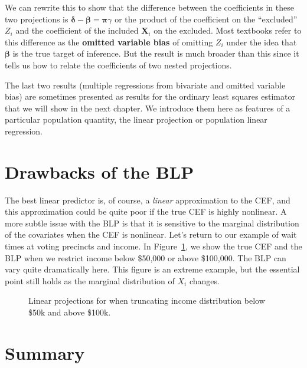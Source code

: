 \documentclass[
  13pt,
  letterpaper,
  DIV=11,
  numbers=noendperiod]{scrreprt}
\newcommand{\bs}{\symbf}
\newcommand{\mb}{\symbf}
\newcommand{\X}{\mb{X}}
\newcommand{\bfbeta}{\mb{\beta}}
\theoremstyle{plain}
\theoremstyle{definition}
\theoremstyle{definition}
\theoremstyle{remark}
\begin{document}
We can rewrite this to show that the difference between the coefficients
in these two projections is \(\bs{\delta} - \bfbeta= \bs{\pi}\gamma\) or
the product of the coefficient on the ``excluded'' \(Z_i\) and the
coefficient of the included \(\X_i\) on the excluded. Most textbooks
refer to this difference as the \textbf{omitted variable bias} of
omitting \(Z_i\) under the idea that \(\bfbeta\) is the true target of
inference. But the result is much broader than this since it tells us
how to relate the coefficients of two nested projections.

The last two results (multiple regressions from bivariate and omitted
variable bias) are sometimes presented as results for the ordinary least
squares estimator that we will show in the next chapter. We introduce
them here as features of a particular population quantity, the linear
projection or population linear regression.

\section{Drawbacks of the BLP}\label{drawbacks-of-the-blp}

The best linear predictor is, of course, a \emph{linear} approximation
to the CEF, and this approximation could be quite poor if the true CEF
is highly nonlinear. A more subtle issue with the BLP is that it is
sensitive to the marginal distribution of the covariates when the CEF is
nonlinear. Let's return to our example of wait times at voting precincts
and income. In Figure~\ref{fig-blp-limits}, we show the true CEF and the
BLP when we restrict income below \$50,000 or above \$100,000. The BLP
can vary quite dramatically here. This figure is an extreme example, but
the essential point still holds as the marginal distribution of \(X_i\)
changes.

\begin{figure}[th]


\caption{\label{fig-blp-limits}Linear projections for when truncating
income distribution below \$50k and above \$100k.}

\end{figure}%

\section{Summary}\label{summary-4}
\end{document}
